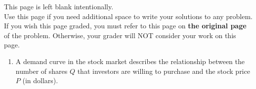 \documentclass[11pt]{article}
\begin{document}
\vfill


\newpage

This page is left blank intentionally.\\

Use this page if you need additional space to write your solutions to any problem. \\

If you wish this page graded, you must refer to this page on \textbf{the original page} of the problem. Otherwise, your grader will NOT consider your work on this page.

\newpage%


\begin{enumerate}


\item A demand curve in the stock market describes the relationship between the number of shares $Q$ that investors are willing to purchase and the stock price $P$ (in dollars).\\
\vspace{0.5cm}

\noindent
\begin{minipage}{0.38\textwidth}
\centering
{}
\end{minipage}
\hfill
\begin{minipage}{0.58\textwidth}
\end{minipage}

\vspace{0.5em}


\end{enumerate}
\end{document}
